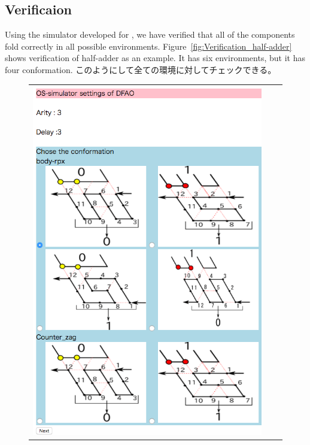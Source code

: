 \subsection{Verificaion}
Using the simulator developed for \cite{}, we have verified that all of the components fold correctly in all possible environments.
Figure~\ref{fig:Verification_half-adder} shows verification of half-adder as an example.
It has six environments, but it has four conformation. 
このようにして全ての環境に対してチェックできる。


\begin{figure}[htb]
\begin{tabular}{ccc}
\begin{minipage}{0.4\hsize}
  \begin{center}
  \includegraphics[width=\linewidth]{pic/Co-zig1.png}
  \end{center}
 \end{minipage}
 

\end{tabular}
\end{figure}
